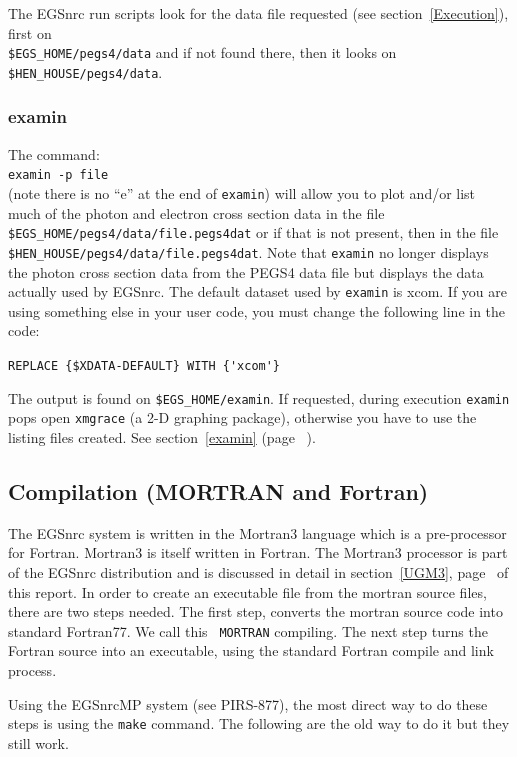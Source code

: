 The EGSnrc run scripts look for the data file requested (see
section~\ref{Execution}), first on\\
\verb+$EGS_HOME/pegs4/data+ and if not
found there, then it looks on \verb+$HEN_HOUSE/pegs4/data+.
\vfill

\subsubsection{examin}
The command:\\
\verb+examin -p file+
\\(note there is no ``e'' at the end of \verb+examin+) will allow you
to plot and/or list much of the photon and electron cross section data
in the file \verb+$EGS_HOME/pegs4/data/file.pegs4dat+ or if that is not
present, then in the file \verb+$HEN_HOUSE/pegs4/data/file.pegs4dat+. Note that
\verb+examin+ no longer displays the photon cross section data from the
PEGS4 data file but displays the data actually used by EGSnrc. The default
dataset used by \verb+examin+ is xcom. If you are using something else in your
user code, you must change the following line in the code:

\verb+REPLACE {$XDATA-DEFAULT} WITH {'xcom'}+

The output is found on \verb+$EGS_HOME/examin+. If requested, during execution
\verb+examin+ pops open \verb+xmgrace+ (a 2-D graphing package), otherwise
you have to use the listing files created. See section~\ref{examin}
(page ~\pageref{examin}).

\subsection{Compilation (MORTRAN and Fortran)}
\label{Compilation}


The EGSnrc system is written in the Mortran3 language which is
a pre-processor for Fortran.  Mortran3 is itself written in
Fortran.  The Mortran3 processor is part of the EGSnrc
distribution and is discussed in detail in section~\ref{UGM3},
page~\pageref{UGM3} of this report.  In order to create an executable file
from the mortran source files, there are two steps needed. The first step,
converts the mortran source code into standard Fortran77. We call this {\tt
MORTRAN} compiling.  The next step turns the Fortran source into an
executable, using the standard Fortran compile and link process.

Using the EGSnrcMP system (see PIRS-877\cite{Ka03}), the most direct way to
do these steps is using the {\tt make} command.  The following are the old
way to do it but they still work.

